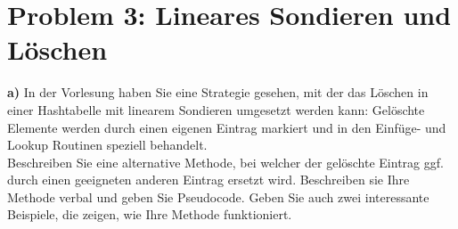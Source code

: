 \section*{Problem 3: Lineares Sondieren und Löschen} 


\noindent
\textbf{a)} In der Vorlesung haben Sie eine Strategie gesehen, mit der das Löschen in einer Hashtabelle mit linearem Sondieren umgesetzt werden kann: Gelöschte Elemente werden durch einen eigenen Eintrag markiert und in den Einfüge- und Lookup Routinen speziell behandelt.\\
Beschreiben Sie eine alternative Methode, bei welcher der gelöschte Eintrag ggf. durch einen geeigneten anderen Eintrag ersetzt wird. Beschreiben sie Ihre Methode verbal und geben Sie Pseudocode. Geben Sie auch zwei interessante Beispiele, die zeigen, wie Ihre Methode funktioniert.\\

